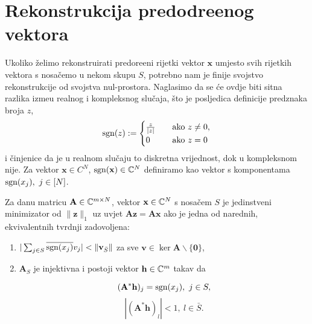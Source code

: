 \documentclass[a4paper,twoside,12pt]{memoir} %
\newcommand{\vect}[1]{\mathbf{#1}}
\renewcommand{\vec}{\vect}
\newcommand{\norm}[1]{\|{#1}\|}
\newcommand{\sgn}{\text{\normalfont{sgn}}}
\begin{document}
\section[Rekonstrukcija predodre\dj enog vektora][Rekonstrukcija predodre\dj enog vektora]{Rekonstrukcija predodre\dj enog vektora}
Ukoliko \v{z}elimo rekonstruirati predore\dj eni rijetki vektor $\vec x$ umjesto svih rijetkih vektora s nosa\v{c}emo u nekom skupu $S$, potrebno nam je finije svojstvo rekonstrukcije od svojstva nul-prostora. Naglasimo da se \'ce ovdje biti sitna razlika izme\dj u realnog i kompleksnog slu\v{c}aja, \v{s}to je posljedica definicije predznaka broja $z$,
\begin{equation*}
    \sgn(z):= 
    \begin{cases}
        \frac{z}{|z|} \quad &\text{ako } z \neq 0,\\
        0 &\text{ako } z = 0
    \end{cases}
\end{equation*}
i \v{c}injenice da je u realnom slu\v{c}aju to diskretna vrijednost, dok u kompleksnom nije. Za vektor $\vec x \in C^N$, $\sgn(\vec x)\in \C^N$ definiramo kao vektor s komponentama $\sgn(x_j),\ j \in [N]$.
\begin{thm}
    Za danu matricu $\vec A \in \C^{m \times N}$, vektor $\vec x \in \C^N$ s nosa\v{c}em $S$ je jedinstveni minimizator od $\norm{\vec z}_1$ uz uvjet $\vec{Az} = \vec{Ax}$ ako je jedna od narednih, ekvivalentnih tvrdnji zadovoljena:
    \begin{enumerate}[label=(\alph*)]
        \item $|\sum_{j \in S} \overline{\sgn(x_j)}v_j| < \norm{\vec v_{\bar S}}$ za sve $\vec v \in \ker \vec A \backslash \{ \vec 0 \}$, 
            \newpage
        \item $\vec A_S$ je injektivna i postoji vektor $\vec h \in \C^m$ takav da
            \begin{multicols}{2}
                \noindent
                \begin{equation*}
                    (\vec A^* \vec h)_j = \sgn(x_j),\ j \in S,
                \end{equation*}
                \begin{equation*}
                    |(\vec A^* \vec h)_l| < 1,\ l \in \bar S.
                \end{equation*}
            \end{multicols}
    \end{enumerate}
\end{thm}
\end{document}
